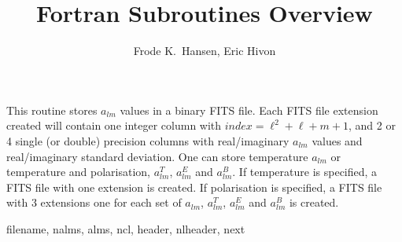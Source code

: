 
\sloppy


\title{\healpix Fortran Subroutines Overview}
 \section[alms2fits*]{ }
\label{sub:alms2fits}
\author{Frode K.~Hansen, Eric Hivon}

\begin{facility}
{This routine stores  $a_{lm}$  values in a binary FITS file. Each FITS file
  extension created will contain one integer column with
  $index=\ell^2+\ell+m+1$, and 2 or 4 single (or double) precision columns with real/imaginary  $a_{lm}$  values and real/imaginary   standard deviation. One can store temperature $a_{lm}$ or temperature and polarisation, $a^T_{lm}$, $a^E_{lm}$ and $a^B_{lm}$. If temperature is specified, a FITS file with one extension is created. If polarisation is specified, a FITS file with 3 extensions one for each set of $a_{lm}$, $a_{lm}^T$, $a_{lm}^E$ and $a_{lm}^B$ is created.}
{\modFitstools}
\end{facility}

\begin{f90format}
{filename, nalms, alms, ncl, header, nlheader, next}
\end{f90format}

